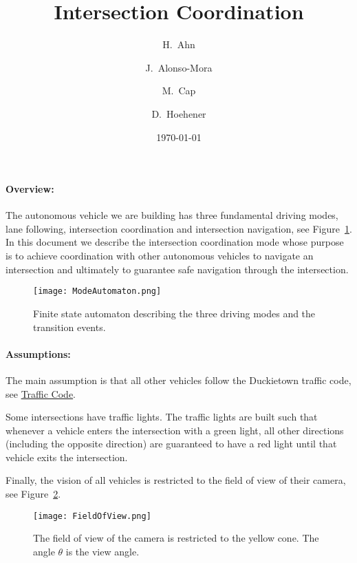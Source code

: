 \documentclass[11pt]{article}
\title{Intersection Coordination}
\author{H.~Ahn \and J.~Alonso-Mora \and M.~Cap \and D.~Hoehener}
\date{\today}
\theoremstyle{definition}
\begin{document}
\maketitle
%
%
\paragraph{Overview:}
The autonomous vehicle we are building has three fundamental driving modes, lane following, intersection coordination and intersection navigation, see Figure~\ref{fig:automatonModes}. In this document we describe the intersection coordination mode whose purpose is to achieve coordination with other autonomous vehicles to navigate an intersection and ultimately to guarantee safe navigation through the intersection.
%
\begin{figure}[hbt]
\begin{center}
\texttt{[image: ModeAutomaton.png]}
\end{center}
\caption{Finite state automaton describing the three driving modes and the transition events.}
\label{fig:automatonModes}
\end{figure}
%
%
\paragraph{Assumptions:} The main assumption is that all other vehicles follow the Duckietown traffic code, see \href{https://docs.google.com/document/d/1D2l8ltY2OGA2Mxw9xxaWS9c03nI4h9DkfiE0oqJpllM/edit\#heading=h.p7zatzzcmadz}{Traffic Code}. 

Some intersections have traffic lights. The traffic lights are built such that whenever a vehicle enters the intersection with a green light, all other directions (including the opposite direction) are guaranteed to have a red light until that vehicle exits the intersection.

Finally, the vision of all vehicles is restricted to the field of view of their camera, see Figure~\ref{fig:FieldOfView}.
%
\begin{figure}[hbt]
\begin{center}
\texttt{[image: FieldOfView.png]}
\end{center}
\caption{The field of view of the camera is restricted to the yellow cone. The angle $\theta$ is the view angle.}
\label{fig:FieldOfView}
\end{figure}


%
%
%
%
\end{document}
